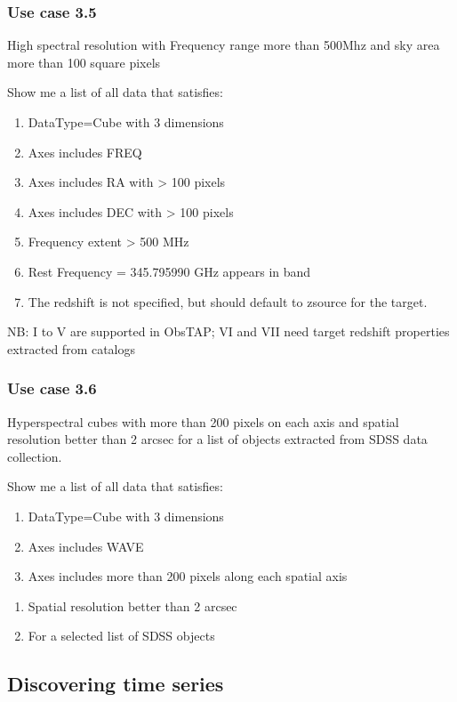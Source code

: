\documentclass[11pt,a4paper]{ivoa}
\begin{document}
\subsubsection{Use case 3.5}
High spectral resolution with Frequency range more than 500Mhz and sky area more than 100 square pixels 

Show me a list of all data that satisfies:

\begin{enumerate}
\item DataType=Cube with 3 dimensions
\item Axes includes FREQ
\item Axes includes RA with {\textgreater} 100 pixels
\item Axes includes DEC with {\textgreater} 100 pixels
\item Frequency extent {\textgreater} 500 MHz
\item Rest Frequency = 345.795990 GHz appears in band
\item The redshift is not specified, but should default to zsource for the target.
\end{enumerate}
NB: I to V are supported in ObsTAP; VI and VII need target redshift properties extracted from catalogs

\subsubsection{Use case 3.6}
Hyperspectral cubes with more than 200 pixels on each axis and spatial resolution better than 2 arcsec for a list of
objects extracted from SDSS data collection.

Show me a list of all data that satisfies:

\begin{enumerate}
\item DataType=Cube with 3 dimensions
\item Axes includes WAVE
\item Axes includes more than 200 pixels along each spatial axis 
\end{enumerate}
\begin{enumerate}
\item Spatial resolution better than 2 arcsec
\item For  a selected list of SDSS objects
\end{enumerate}
\subsection[Discovering time series]{Discovering time series}
\end{document}
